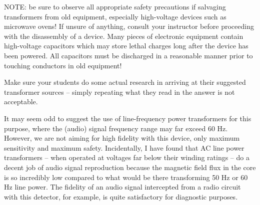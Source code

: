 \vskip 10pt

NOTE: be sure to observe all appropriate safety precautions if salvaging transformers from old equipment, especially high-voltage devices such as microwave ovens!  If unsure of anything, consult your instructor before proceeding with the disassembly of a device.  Many pieces of electronic equipment contain high-voltage capacitors which may store lethal charges long after the device has been powered.  All capacitors must be discharged in a reasonable manner prior to touching conductors in old equipment!







Make sure your students do some actual research in arriving at their suggested transformer sources -- simply repeating what they read in the answer is not acceptable.

It may seem odd to suggest the use of line-frequency power transformers for this purpose, where the (audio) signal frequency range may far exceed 60 Hz.  However, we are not aiming for high fidelity with this device, only maximum sensitivity and maximum safety.  Incidentally, I have found that AC line power transformers -- when operated at voltages far below their winding ratings -- do a decent job of audio signal reproduction because the magnetic field flux in the core is so incredibly low compared to what would be there transforming 50 Hz or 60 Hz line power.  The fidelity of an audio signal intercepted from a radio circuit with this detector, for example, is quite satisfactory for diagnostic purposes.



